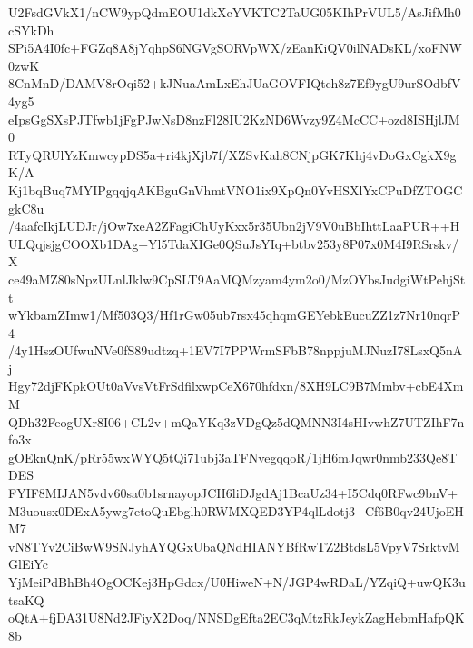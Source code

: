 U2FsdGVkX1/nCW9ypQdmEOU1dkXcYVKTC2TaUG05KIhPrVUL5/AsJifMh0cSYkDh
SPi5A4I0fc+FGZq8A8jYqhpS6NGVgSORVpWX/zEanKiQV0ilNADsKL/xoFNW0zwK
8CnMnD/DAMV8rOqi52+kJNuaAmLxEhJUaGOVFIQtch8z7Ef9ygU9urSOdbfV4yg5
eIpsGgSXsPJTfwb1jFgPJwNsD8nzFl28IU2KzND6Wvzy9Z4McCC+ozd8ISHjlJM0
RTyQRUlYzKmwcypDS5a+ri4kjXjb7f/XZSvKah8CNjpGK7Khj4vDoGxCgkX9gK/A
Kj1bqBuq7MYIPgqqjqAKBguGnVhmtVNO1ix9XpQn0YvHSXlYxCPuDfZTOGCgkC8u
/4aafcIkjLUDJr/jOw7xeA2ZFagiChUyKxx5r35Ubn2jV9V0uBbIhttLaaPUR++H
ULQqjsjgCOOXb1DAg+Yl5TdaXIGe0QSuJsYIq+btbv253y8P07x0M4I9RSrskv/X
ce49aMZ80sNpzULnlJklw9CpSLT9AaMQMzyam4ym2o0/MzOYbsJudgiWtPehjStt
wYkbamZImw1/Mf503Q3/Hf1rGw05ub7rsx45qhqmGEYebkEucuZZ1z7Nr10nqrP4
/4y1HszOUfwuNVe0fS89udtzq+1EV7I7PPWrmSFbB78nppjuMJNuzI78LsxQ5nAj
Hgy72djFKpkOUt0aVvsVtFrSdfilxwpCeX670hfdxn/8XH9LC9B7Mmbv+cbE4XmM
QDh32FeogUXr8I06+CL2v+mQaYKq3zVDgQz5dQMNN3I4sHIvwhZ7UTZIhF7nfo3x
gOEknQnK/pRr55wxWYQ5tQi71ubj3aTFNvegqqoR/1jH6mJqwr0nmb233Qe8TDES
FYIF8MIJAN5vdv60sa0b1srnayopJCH6liDJgdAj1BcaUz34+I5Cdq0RFwc9bnV+
M3uousx0DExA5ywg7etoQuEbglh0RWMXQED3YP4qlLdotj3+Cf6B0qv24UjoEHM7
vN8TYv2CiBwW9SNJyhAYQGxUbaQNdHIANYBfRwTZ2BtdsL5VpyV7SrktvMGlEiYc
YjMeiPdBhBh4OgOCKej3HpGdcx/U0HiweN+N/JGP4wRDaL/YZqiQ+uwQK3utsaKQ
oQtA+fjDA31U8Nd2JFiyX2Doq/NNSDgEfta2EC3qMtzRkJeykZagHebmHafpQK8b
